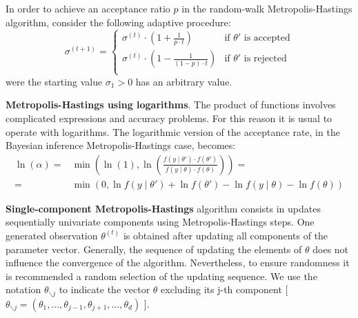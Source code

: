 \documentclass[11pt,fleqn]{book} %
\begin{document}
\begin{proposition}
	In order to achieve an acceptance ratio $p$ in the random-walk 
	Metropolis-Hastings algorithm, consider the following adaptive
	procedure:
	\begin{displaymath}
		\sigma^{(t+1)} = \left\{
		\begin{array}{ll}
			\sigma^{(t)} \cdot \left( 1 + \frac{1}{p \cdot t} \right) & \text{if $\theta'$ is accepted} \\
			\sigma^{(t)} \cdot \left( 1 - \frac{1}{(1-p) \cdot t} \right) & \text{if $\theta'$ is rejected} \\
		\end{array}
		\right.
	\end{displaymath}
	were the starting value $\sigma_1 > 0$ has an arbitrary value.
\end{proposition}

\textbf{Metropolis-Hastings using logarithms}.
The product of functions involves complicated expressions and accuracy 
problems. For this reason it is usual to operate with logarithms. The 
logarithmic version of the acceptance rate, in the Bayesian inference 
Metropolis-Hastings case, becomes:
\begin{displaymath}
	\begin{array}{rl}
		\ln(\alpha) = & \min \left( \ln(1),  
		\ln \left(\frac{f(y \mid \theta') \cdot f(\theta')}{f(y \mid \theta) \cdot f(\theta)}\right)
		\right) = \\
		= & \min \left( 0,
		\ln f(y \mid \theta') + \ln f(\theta') - \ln f(y \mid \theta) - \ln f(\theta)
		\right)
	\end{array}
\end{displaymath}

\textbf{Single-component Metropolis-Hastings} algorithm consists in updates 
sequentially univariate components using Metropolis-Hastings steps. 
One generated observation $\theta^{(t)}$ is obtained after updating all 
components of the parameter vector. Generally, the sequence of updating the 
elements of $\theta$ does not influence the convergence of the algorithm.
Nevertheless, to ensure randomness it is recommended a random selection of 
the updating sequence. We use the notation $\theta_{\backslash j}$ to indicate 
the vector $\theta$ excluding its j-th component [ $\theta_{\backslash j}
= (\theta_1,\dots,\theta_{j-1},\theta_{j+1},\dots,\theta_{d})$ ].
\end{document}
